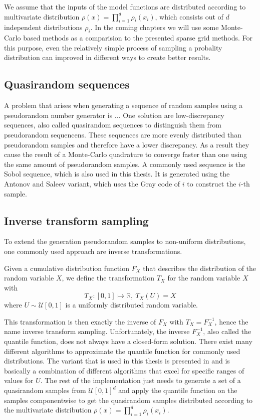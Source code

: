\documentclass[
  a4paper,  %
  twoside,  %
  bibliography=totoc,
  headsepline,
  cleardoublepage=empty,
  parskip=half,
  draft=false
]{scrbook}
\begin{document}
We assume that the inputs of the model functions are distributed according to multivariate distribution $\rho(x)=\prod_{i=1}^d \rho_i(x_i)$, which consists out of $d$ independent distributions $\rho_i$.
In the coming chapters we will use some Monte-Carlo based methods as a comparision to the presented sparse grid methods.
For this purpose, even the relatively simple process of sampling a probality distribution can improved in different ways to create better results.

\subsection{Quasirandom sequences}

A problem that arises when generating a sequence of random samples using a pseudorandom number generator is ...
One solution are low-discrepancy sequences, also called quasirandom sequences to distinguish them from pseudorandom sequencens.
These sequences are more evenly distributed than pseudorandom samples and therefore have a lower discrepancy.
As a result they cause the result of a Monte-Carlo quadrature to converge faster than one using the same amount of pseudorandom samples.
A commonly used sequence is the Sobol sequence, which is also used in this thesis.
It is generated using the Antonov and Saleev variant, which uses the Gray code of $i$ to construct the $i$-th sample.

\subsection{Inverse transform sampling}
To extend the generation pseudorandom samples to non-uniform distributions, one commonly used approach are inverse transformations.
\begin{definition}
Given a cumulative distribution function $F_X$ that describes the distribution of the random variable $X$, we define the transformation $T_X$ for the random variable $X$ with
\begin{equation}
T_X \colon [0,1] \mapsto \mathds{R}, ~ T_X(U)=X
\end{equation}
where $U \sim \mathcal{U}[0,1]$ is a uniformly distributed random variable.
\end{definition}
This transformation is then exactly the inverse of $F_X$ with $T_X=F_X^{-1}$, hence the name inverse transform sampling.
Unfortunately, the inverse $F_X^{-1}$, also called the quantile function, does not always have a closed-form solution.
There exist many different algorithms to approximate the quantile function for commonly used distributions.
The variant that is used in this thesis is presented in \cite{} and is basically a combination of different algorithms that excel for specific ranges of values for $U$.
The rest of the implementation just needs to generate a set of a quasirandom samples from $\mathcal{U}[0,1]^d$ and apply the quantile function on the samples componentwise to get the quasirandom samples distributed according to the multivariate distribution $\rho(x)=\prod_{i=1}^d \rho_i(x_i)$.
\end{document}
